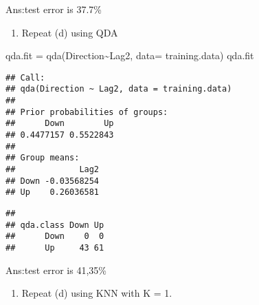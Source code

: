 \documentclass[
]{article}
\newenvironment{Shaded}{\begin{snugshade}}{\end{snugshade}}
\newcommand{\AttributeTok}[1]{\textcolor[rgb]{0.77,0.63,0.00}{#1}}
\newcommand{\DecValTok}[1]{\textcolor[rgb]{0.00,0.00,0.81}{#1}}
\newcommand{\FunctionTok}[1]{\textcolor[rgb]{0.00,0.00,0.00}{#1}}
\newcommand{\NormalTok}[1]{#1}
\newcommand{\OtherTok}[1]{\textcolor[rgb]{0.56,0.35,0.01}{#1}}
\newcommand{\SpecialCharTok}[1]{\textcolor[rgb]{0.00,0.00,0.00}{#1}}
\newcommand{\StringTok}[1]{\textcolor[rgb]{0.31,0.60,0.02}{#1}}
\providecommand{\tightlist}{%
  \setlength{\itemsep}{0pt}\setlength{\parskip}{0pt}}
\begin{document}
Ans:test error is 37.7\%

\begin{enumerate}
\def\labelenumi{(\alph{enumi})}
\setcounter{enumi}{5}
\tightlist
\item
  Repeat (d) using QDA
\end{enumerate}

\begin{Shaded}
\begin{Highlighting}[]
\NormalTok{qda.fit }\OtherTok{=} \FunctionTok{qda}\NormalTok{(Direction}\SpecialCharTok{\textasciitilde{}}\NormalTok{Lag2, }\AttributeTok{data=}\NormalTok{ training.data)}
\NormalTok{qda.fit}
\end{Highlighting}
\end{Shaded}

\begin{verbatim}
## Call:
## qda(Direction ~ Lag2, data = training.data)
## 
## Prior probabilities of groups:
##      Down        Up 
## 0.4477157 0.5522843 
## 
## Group means:
##             Lag2
## Down -0.03568254
## Up    0.26036581
\end{verbatim}

\begin{Shaded}
\end{Shaded}

\begin{verbatim}
##          
## qda.class Down Up
##      Down    0  0
##      Up     43 61
\end{verbatim}

Ans:test error is 41,35\%

\begin{enumerate}
\def\labelenumi{(\alph{enumi})}
\setcounter{enumi}{6}
\tightlist
\item
  Repeat (d) using KNN with K = 1.
\end{enumerate}

\begin{Shaded}
\end{Shaded}
\end{document}
